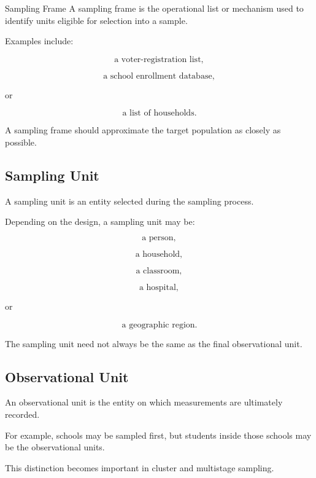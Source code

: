 \begin{definitionbox}{Sampling Frame}
A sampling frame is the operational list or mechanism used to identify
units eligible for selection into a sample.
\end{definitionbox}

Examples include:

\[
\text{a voter-registration list},
\]

\[
\text{a school enrollment database},
\]

or

\[
\text{a list of households}.
\]

A sampling frame should approximate the target population as closely as
possible.

\subsection{Sampling Unit}
\label{subsec:sampling-unit}

A sampling unit is an entity selected during the sampling process.

Depending on the design, a sampling unit may be:

\[
\text{a person},
\]

\[
\text{a household},
\]

\[
\text{a classroom},
\]

\[
\text{a hospital},
\]

or

\[
\text{a geographic region}.
\]

The sampling unit need not always be the same as the final observational
unit.

\subsection{Observational Unit}
\label{subsec:observational-unit}

An observational unit is the entity on which measurements are ultimately
recorded.

For example, schools may be sampled first, but students inside those
schools may be the observational units.

This distinction becomes important in cluster and multistage sampling.


